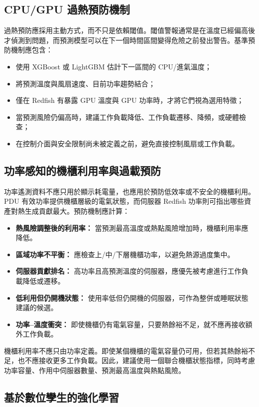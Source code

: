 \documentclass[12pt,a4paper]{article}
\begin{document}
\subsection{CPU/GPU 過熱預防機制}

過熱預防應採用主動方式，而不只是依賴閾值。閾值警報通常是在溫度已經偏高後才偵測到問題，而預測模型可以在下一個時間區間變得危險之前發出警告。基準預防機制應包含：
\begin{itemize}
\item 使用 XGBoost 或 LightGBM 估計下一區間的 CPU/進氣溫度；
\item 將預測溫度與風扇速度、目前功率趨勢結合；
\item 僅在 Redfish 有暴露 GPU 溫度與 GPU 功率時，才將它們視為選用特徵；
\item 當預測風險仍偏高時，建議工作負載降低、工作負載遷移、降頻，或硬體檢查；
\item 在控制介面與安全限制尚未被定義之前，避免直接控制風扇或工作負載。
\end{itemize}

\subsection{功率感知的機櫃利用率與過載預防}

功率遙測資料不應只用於顯示耗電量，也應用於預防低效率或不安全的機櫃利用。PDU 有效功率提供機櫃層級的電氣狀態，而伺服器 Redfish 功率則可指出哪些資產對熱生成貢獻最大。預防機制應計算：
\begin{itemize}
\item \textbf{熱風險調整後的利用率：} 當預測最高溫度或熱點風險增加時，機櫃利用率應降低。
\item \textbf{區域功率不平衡：} 應檢查上/中/下層機櫃功率，以避免熱源過度集中。
\item \textbf{伺服器貢獻排名：} 高功率且高預測溫度的伺服器，應優先被考慮進行工作負載降低或遷移。
\item \textbf{低利用但仍開機狀態：} 使用率低但仍開機的伺服器，可作為整併或睡眠狀態建議的候選。
\item \textbf{功率--溫度衝突：} 即使機櫃仍有電氣容量，只要熱餘裕不足，就不應再接收額外工作負載。
\end{itemize}

機櫃利用率不應只由功率定義。即使某個機櫃的電氣容量仍可用，但若其熱餘裕不足，也不應接收更多工作負載。因此，建議使用一個聯合機櫃狀態指標，同時考慮功率容量、作用中伺服器數量、預測最高溫度與熱點風險。

\subsection{基於數位孿生的強化學習}
\end{document}
